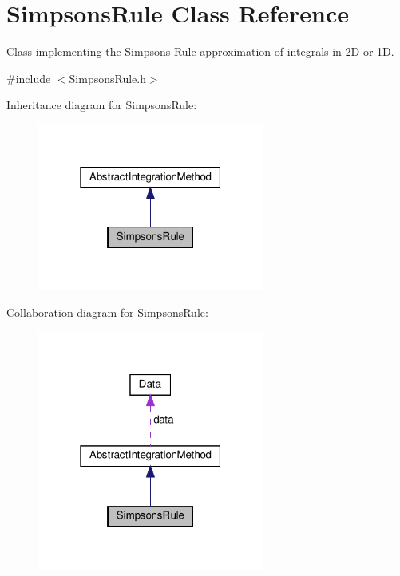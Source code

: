 \hypertarget{class_simpsons_rule}{}\section{Simpsons\+Rule Class Reference}
\label{class_simpsons_rule}


Class implementing the Simpson\textquotesingle{}s Rule approximation of integrals in 2D or 1D.  




{\ttfamily \#include $<$Simpsons\+Rule.\+h$>$}



Inheritance diagram for Simpsons\+Rule\+:\nopagebreak
\begin{figure}[H]
\begin{center}
\leavevmode
\includegraphics[width=211pt]{class_simpsons_rule__inherit__graph}
\end{center}
\end{figure}


Collaboration diagram for Simpsons\+Rule\+:\nopagebreak
\begin{figure}[H]
\begin{center}
\leavevmode
\includegraphics[width=211pt]{class_simpsons_rule__coll__graph}
\end{center}
\end{figure}
